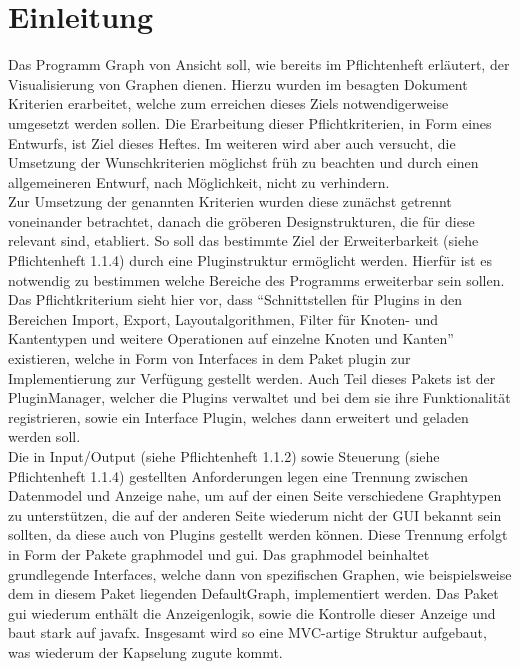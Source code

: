 \chapter{Einleitung}
\label{ch:einleitung}

Das Programm Graph von Ansicht soll, wie bereits im Pflichtenheft erläutert, der Visualisierung von Graphen dienen. Hierzu wurden im besagten Dokument Kriterien erarbeitet, welche zum erreichen dieses Ziels notwendigerweise umgesetzt werden sollen. Die Erarbeitung dieser Pflichtkriterien, in Form eines Entwurfs, ist Ziel dieses Heftes. Im weiteren wird aber auch versucht, die Umsetzung der Wunschkriterien möglichst früh zu beachten und durch einen allgemeineren Entwurf, nach Möglichkeit, nicht zu verhindern. \\
Zur Umsetzung der genannten Kriterien wurden diese zunächst getrennt voneinander betrachtet, danach die gröberen Designstrukturen, die für diese relevant sind, etabliert. So soll das bestimmte Ziel der Erweiterbarkeit (siehe Pflichtenheft 1.1.4) durch eine Pluginstruktur ermöglicht werden. Hierfür ist es notwendig zu bestimmen welche Bereiche des Programms erweiterbar sein sollen. Das Pflichtkriterium sieht hier vor, dass "`Schnittstellen für Plugins in den Bereichen Import, Export, Layoutalgorithmen, Filter für Knoten- und Kantentypen und weitere Operationen auf einzelne Knoten und Kanten"' existieren, welche in Form von Interfaces in dem Paket plugin zur Implementierung zur Verfügung gestellt werden. Auch Teil dieses Pakets ist der PluginManager, welcher die Plugins verwaltet und bei dem sie ihre Funktionalität registrieren, sowie ein Interface Plugin, welches dann erweitert und geladen werden soll.\\
Die in Input/Output (siehe Pflichtenheft 1.1.2) sowie Steuerung (siehe Pflichtenheft 1.1.4) gestellten Anforderungen legen eine Trennung zwischen Datenmodel und Anzeige nahe, um auf der einen Seite verschiedene Graphtypen zu unterstützen, die auf der anderen Seite wiederum nicht der GUI bekannt sein sollten, da diese auch von Plugins gestellt werden können. Diese Trennung erfolgt in Form der Pakete graphmodel und gui. Das graphmodel beinhaltet grundlegende Interfaces, welche dann von spezifischen Graphen, wie beispielsweise dem in diesem Paket liegenden DefaultGraph, implementiert werden. Das Paket gui wiederum enthält die Anzeigenlogik, sowie die Kontrolle dieser Anzeige und baut stark auf javafx. Insgesamt wird so eine MVC-artige Struktur aufgebaut, was wiederum der Kapselung zugute kommt.\\
